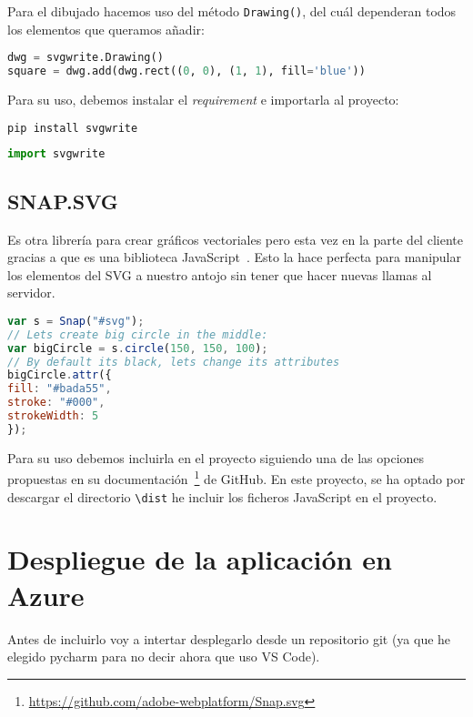 Para el dibujado hacemos uso del método \texttt{Drawing()}, del cuál dependeran todos los elementos que queramos añadir:
\renewcommand{\lstlistingname}{SVGWRITE}
\renewcommand{\lstlistlistingname}{List of \lstlistingname s}
\begin{lstlisting}[language=python,caption={Ejemplo de uso.}]
dwg = svgwrite.Drawing()
square = dwg.add(dwg.rect((0, 0), (1, 1), fill='blue'))
\end{lstlisting}

Para su uso, debemos instalar el \textit{requirement} e importarla al proyecto:
\begin{lstlisting}[language=python,caption={Instalación mediante pip.}]
pip install svgwrite
\end{lstlisting}
\begin{lstlisting}[language=python,caption={Importación.}]
import svgwrite
\end{lstlisting}

\subsection{SNAP.SVG}\label{snapsvg}
Es otra librería para crear gráficos vectoriales pero esta vez en la parte del cliente gracias a que es una biblioteca JavaScript~\cite{doc:snapsvg}. Esto la hace perfecta para manipular los elementos del SVG a nuestro antojo sin tener que hacer nuevas llamas al servidor.
\renewcommand{\lstlistingname}{Snap.svg}
\renewcommand{\lstlistlistingname}{List of \lstlistingname s}
\begin{lstlisting}[language=javascript,caption={Ejemplo}]
var s = Snap("#svg");
// Lets create big circle in the middle:
var bigCircle = s.circle(150, 150, 100);
// By default its black, lets change its attributes
bigCircle.attr({
fill: "#bada55",
stroke: "#000",
strokeWidth: 5
});
\end{lstlisting}

Para su uso debemos incluirla en el proyecto siguiendo una de las opciones propuestas en su documentación~\footnote{\url{https://github.com/adobe-webplatform/Snap.svg}} de GitHub. En este proyecto, se ha optado por descargar el directorio \texttt{\textbackslash{dist}} he incluir los ficheros JavaScript en el proyecto.


\section{Despliegue de la aplicación en Azure}
Antes de incluirlo voy a intertar desplegarlo desde un repositorio git (ya que he elegido pycharm para no decir ahora que uso VS Code).


